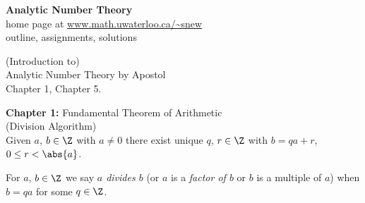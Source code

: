 \textbf{Analytic Number Theory} \\
home page at \url{www.math.uwaterloo.ca/~snew} \\
outline, assignments, solutions

(Introduction to) \\
Analytic Number Theory by Apostol \\
Chapter 1, Chapter 5.

\textbf{Chapter 1:} Fundamental Theorem of Arithmetic \\
\thm (Division Algorithm) \\
Given $a$, $b\in\Z$ with $a\neq0$ there exist unique $q$, $r\in\Z$ with $b=qa+r$, $0\leq r<\abs{a}$.

 For $a$, $b\in\Z$ we say \emph{$a$ divides\/ $b$} (or $a$ is a \emph{factor of\/ $b$} or $b$ is a multiple of $a$) when $b=qa$ for some $q\in\Z$.

